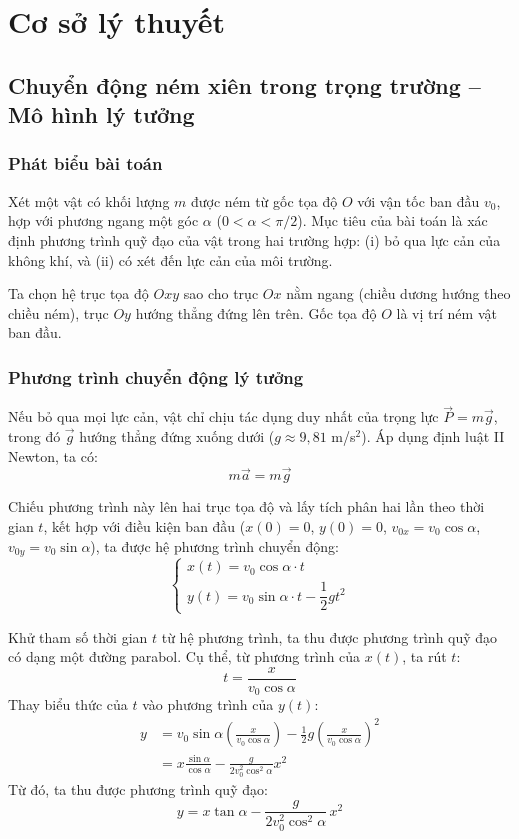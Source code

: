 \section{Cơ sở lý thuyết}

\subsection{Chuyển động ném xiên trong trọng trường -- Mô hình lý tưởng}
\subsubsection{Phát biểu bài toán}
Xét một vật có khối lượng $m$ được ném từ gốc tọa độ $O$ với vận tốc ban đầu $v_0$, hợp với phương ngang một góc $\alpha$ ($0 < \alpha < \pi/2$). Mục tiêu của bài toán là xác định phương trình quỹ đạo của vật trong hai trường hợp: (i) bỏ qua lực cản của không khí, và (ii) có xét đến lực cản của môi trường.

Ta chọn hệ trục tọa độ $Oxy$ sao cho trục $Ox$ nằm ngang (chiều dương hướng theo chiều ném), trục $Oy$ hướng thẳng đứng lên trên. Gốc tọa độ $O$ là vị trí ném vật ban đầu.

\subsubsection{Phương trình chuyển động lý tưởng}
Nếu bỏ qua mọi lực cản, vật chỉ chịu tác dụng duy nhất của trọng lực $\vec{P} = m\vec{g}$, trong đó $\vec{g}$ hướng thẳng đứng xuống dưới ($g \approx 9{,}81$ m/s$^2$). Áp dụng định luật II Newton, ta có:
$$m\vec{a} = m\vec{g}$$

Chiếu phương trình này lên hai trục tọa độ và lấy tích phân hai lần theo thời gian $t$, kết hợp với điều kiện ban đầu ($x(0) = 0$, $y(0) = 0$, $v_{0x} = v_0\cos\alpha$, $v_{0y} = v_0\sin\alpha$), ta được hệ phương trình chuyển động:
\begin{equation}
\begin{cases}
x(t) = v_0 \cos\alpha \cdot t \\[6pt]
y(t) = v_0 \sin\alpha \cdot t - \dfrac{1}{2}gt^2
\end{cases}
\label{eq:ideal}
\end{equation}

Khử tham số thời gian $t$ từ hệ phương trình, ta thu được phương trình quỹ đạo có dạng một đường parabol. Cụ thể, từ phương trình của $x(t)$, ta rút $t$:
\begin{equation*}
t = \frac{x}{v_0 \cos\alpha}
\end{equation*}
Thay biểu thức của $t$ vào phương trình của $y(t)$:
\begin{align*}
y &= v_0 \sin\alpha \left( \frac{x}{v_0 \cos\alpha} \right) - \frac{1}{2}g \left( \frac{x}{v_0 \cos\alpha} \right)^2 \\
&= x \frac{\sin\alpha}{\cos\alpha} - \frac{g}{2v_0^2\cos^2\alpha}x^2
\end{align*}
Từ đó, ta thu được phương trình quỹ đạo:
\begin{equation}
y = x\tan\alpha - \frac{g}{2v_0^2\cos^2\alpha}\,x^2
\label{eq:parabola}
\end{equation}

